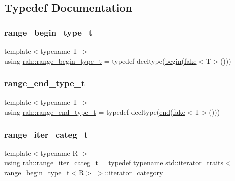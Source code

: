 \subsection{Typedef Documentation}
\mbox{\label{namespacerah_a28aff4eeddcece6be65ff0b956d32d4a}} 
\subsubsection{\texorpdfstring{range\_begin\_type\_t}{range\_begin\_type\_t}}
{\footnotesize\ttfamily template$<$typename T $>$ \\
using \mbox{\hyperlink{namespacerah_a28aff4eeddcece6be65ff0b956d32d4a}{rah\+::range\+\_\+begin\+\_\+type\+\_\+t}} = typedef decltype(\mbox{\hyperlink{namespacerah_a2c4a19e57cc4e0753e93830f247def6d}{begin}}(\mbox{\hyperlink{namespacerah_aa659f5ae02cb923cd8813f96cfd86a25}{fake}}$<$T$>$()))}

\mbox{\label{namespacerah_a9657e24ae477f4482225b133fe286b65}} 
\subsubsection{\texorpdfstring{range\_end\_type\_t}{range\_end\_type\_t}}
{\footnotesize\ttfamily template$<$typename T $>$ \\
using \mbox{\hyperlink{namespacerah_a9657e24ae477f4482225b133fe286b65}{rah\+::range\+\_\+end\+\_\+type\+\_\+t}} = typedef decltype(\mbox{\hyperlink{namespacerah_aaddd1442cd76b96876e692cdefe7261d}{end}}(\mbox{\hyperlink{namespacerah_aa659f5ae02cb923cd8813f96cfd86a25}{fake}}$<$T$>$()))}

\mbox{\label{namespacerah_aff9b9a5748e293f6a1726308c1ac1a01}} 
\subsubsection{\texorpdfstring{range\_iter\_categ\_t}{range\_iter\_categ\_t}}
{\footnotesize\ttfamily template$<$typename R $>$ \\
using \mbox{\hyperlink{namespacerah_aff9b9a5748e293f6a1726308c1ac1a01}{rah\+::range\+\_\+iter\+\_\+categ\+\_\+t}} = typedef typename std\+::iterator\+\_\+traits$<$\mbox{\hyperlink{namespacerah_a28aff4eeddcece6be65ff0b956d32d4a}{range\+\_\+begin\+\_\+type\+\_\+t}}$<$R$>$ $>$\+::iterator\+\_\+category}

